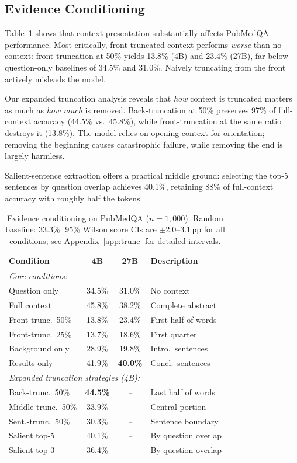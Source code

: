 \documentclass[runningheads,a4paper]{llncs}
\begin{document}
\subsection{Evidence Conditioning}

Table~\ref{tab:evidence} shows that context presentation substantially affects PubMedQA performance. Most critically, front-truncated context performs \textit{worse} than no context: front-truncation at 50\% yields 13.8\% (4B) and 23.4\% (27B), far below question-only baselines of 34.5\% and 31.0\%. Naively truncating from the front actively misleads the model.

Our expanded truncation analysis reveals that \textit{how} context is truncated matters as much as \textit{how much} is removed. Back-truncation at 50\% preserves 97\% of full-context accuracy (44.5\% vs.\ 45.8\%), while front-truncation at the same ratio destroys it (13.8\%). The model relies on opening context for orientation; removing the beginning causes catastrophic failure, while removing the end is largely harmless.

Salient-sentence extraction offers a practical middle ground: selecting the top-5 sentences by question overlap achieves 40.1\%, retaining 88\% of full-context accuracy with roughly half the tokens.

\begin{table}[t]
\centering
\caption{Evidence conditioning on PubMedQA ($n{=}1{,}000$). Random baseline: 33.3\%. 95\% Wilson score CIs are $\pm$2.0--3.1\,pp for all conditions; see Appendix~\ref{app:trunc} for detailed intervals.}
\label{tab:evidence}
\begin{tabular}{lccl}
\toprule
\textbf{Condition} & \textbf{4B} & \textbf{27B} & \textbf{Description} \\
\midrule
\multicolumn{4}{l}{\textit{Core conditions:}} \\
Question only & 34.5\% & 31.0\% & No context \\
Full context & 45.8\% & 38.2\% & Complete abstract \\
Front-trunc.\ 50\% & 13.8\% & 23.4\% & First half of words \\
Front-trunc.\ 25\% & 13.7\% & 18.6\% & First quarter \\
Background only & 28.9\% & 19.8\% & Intro.\ sentences \\
Results only & 41.9\% & \textbf{40.0\%} & Concl.\ sentences \\
\midrule
\multicolumn{4}{l}{\textit{Expanded truncation strategies (4B):}} \\
Back-trunc.\ 50\% & \textbf{44.5\%} & \textit{--} & Last half of words \\
Middle-trunc.\ 50\% & 33.9\% & \textit{--} & Central portion \\
Sent.-trunc.\ 50\% & 30.3\% & \textit{--} & Sentence boundary \\
Salient top-5 & 40.1\% & \textit{--} & By question overlap \\
Salient top-3 & 36.4\% & \textit{--} & By question overlap \\
\bottomrule
\end{tabular}
\end{table}
\end{document}
